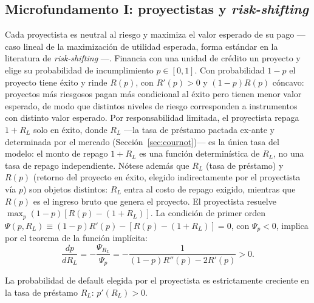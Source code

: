 \subsection{Microfundamento I: proyectistas y \textit{risk-shifting}}\label{sec:proyectistas}
Cada proyectista es neutral al riesgo y maximiza el valor esperado de su pago —caso lineal de
la maximización de utilidad esperada, forma estándar en la literatura de \textit{risk-shifting}
\citep{StiglitzWeiss1981,BoydDeNicolo2005}—. Financia con una unidad de crédito un proyecto y
elige su probabilidad de incumplimiento $p\in[0,1]$. Con probabilidad $1-p$ el proyecto tiene éxito y
rinde $R(p)$, con $R'(p)>0$ y $(1-p)R(p)$ cóncavo: proyectos más riesgosos pagan más
condicional al éxito pero tienen menor valor esperado, de modo que distintos niveles de riesgo
corresponden a instrumentos con distinto valor esperado. Por responsabilidad limitada, el
proyectista repaga $1+R_L$ solo en éxito, donde $R_L$ —la tasa de préstamo pactada ex-ante y
determinada por el mercado (Sección~\ref{sec:cournot})— es la única tasa del modelo: el monto de
repago $1+R_L$ es una función determinística de $R_L$, no una tasa de repago independiente.
Nótese además que $R_L$ (tasa de préstamo) y $R(p)$ (retorno del proyecto en éxito, elegido
indirectamente por el proyectista vía $p$) son objetos distintos: $R_L$ entra al costo de
repago exigido, mientras que $R(p)$ es el ingreso bruto que genera el proyecto. El proyectista
resuelve $\max_p (1-p)[R(p)-(1+R_L)]$. La condición de primer orden
$\Psi(p,R_L)\equiv(1-p)R'(p)-[R(p)-(1+R_L)]=0$, con $\Psi_p<0$, implica por el teorema de la
función implícita:
\begin{equation}
\frac{dp}{dR_L} = -\frac{\Psi_{R_L}}{\Psi_p} = -\frac{1}{(1-p)R''(p)-2R'(p)} > 0.
\label{eq:riskshift}
\end{equation}

\begin{lemma}\label{lem:rs}
La probabilidad de default elegida por el proyectista es estrictamente creciente en la tasa de
préstamo $R_L$: $p'(R_L)>0$.
\end{lemma}

